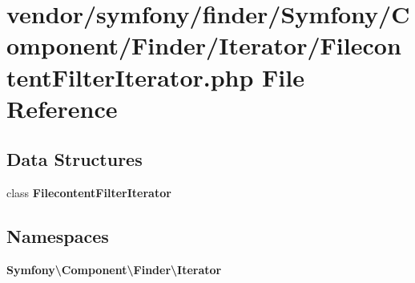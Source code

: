 \section{vendor/symfony/finder/\+Symfony/\+Component/\+Finder/\+Iterator/\+Filecontent\+Filter\+Iterator.php File Reference}
\label{_filecontent_filter_iterator_8php}
\subsection*{Data Structures}
\begin{DoxyCompactItemize}
\item 
class {\bf Filecontent\+Filter\+Iterator}
\end{DoxyCompactItemize}
\subsection*{Namespaces}
\begin{DoxyCompactItemize}
\item 
 {\bf Symfony\textbackslash{}\+Component\textbackslash{}\+Finder\textbackslash{}\+Iterator}
\end{DoxyCompactItemize}
